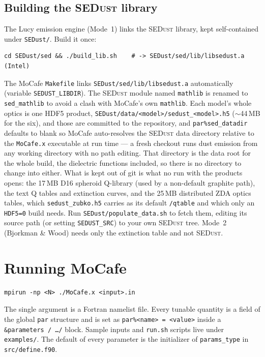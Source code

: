 \documentclass[english,a4paper]{kiseon_memo}
\newcommand{\code}[1]{\texttt{#1}}
\newcommand{\file}[1]{\texttt{#1}}
\begin{document}
\subsection{Building the \textsc{SEDust} library}
The Lucy emission engine (Mode~1) links the \textsc{SEDust} library,
kept self-contained under \file{SEDust/}.  Build it once:
\begin{lstlisting}[style=sh]
cd SEDust/sed && ./build_lib.sh    # -> SEDust/sed/lib/libsedust.a  (Intel)
\end{lstlisting}
The MoCafe \file{Makefile} links \file{SEDust/sed/lib/libsedust.a}
automatically (variable \code{SEDUST\_LIBDIR}).  The \textsc{SEDust} module
named \code{mathlib} is renamed to \code{sed\_mathlib} to avoid a clash with
MoCafe's own \code{mathlib}.  Each model's whole optics is one HDF5 product,
\file{SEDust/data/<model>/sedust\_<model>.h5} ($\sim$44\,MB for the six), and
those are committed to the repository, and
\code{par\%sed\_datadir} defaults to blank so MoCafe auto-resolves the
\textsc{SEDust} data directory relative to the \file{MoCafe.x} executable at
run time --- a fresh checkout runs dust emission from any working directory with
no path editing.  That directory is the data root for the whole build, the
dielectric functions included, so there is no directory to change into either.
What is kept out of git is what no run with the products opens: the 17\,MB D16
spheroid Q-library (used by a non-default graphite path), the text Q tables and
extinction curves, and the 25\,MB distributed ZDA optics tables, which
\file{sedust\_zubko.h5} carries as its default \code{/qtable} and which only an
\code{HDF5=0} build needs.  Run \file{SEDust/populate\_data.sh} to fetch them,
editing its source path (or setting \code{SEDUST\_SRC}) to your own
\textsc{SEDust} tree.  Mode~2 (Bjorkman \& Wood) needs only the extinction table
and not \textsc{SEDust}.

\section{Running MoCafe}
\begin{lstlisting}[style=sh]
mpirun -np <N> ./MoCafe.x <input>.in
\end{lstlisting}
The single argument is a Fortran namelist file.  Every tunable quantity is a
field of the global \code{par} structure and is set as
\code{par\%<name> = <value>} inside a \code{\&parameters / \ldots /} block.
Sample inputs and \file{run.sh} scripts live under \file{examples/}.
The default of every parameter is the initializer of \code{params\_type} in
\file{src/define.f90}.
\end{document}
